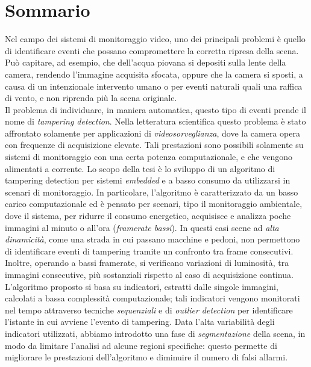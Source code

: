 \newpage
\chapter*{Sommario}


Nel campo dei sistemi di monitoraggio video, uno dei principali problemi \`e quello di identificare eventi che possano compromettere la corretta ripresa della scena.
Pu\`o capitare, ad esempio, che dell'acqua piovana si depositi sulla lente della camera, rendendo l'immagine acquisita sfocata, oppure che la camera si sposti, a causa di un intenzionale intervento umano o per eventi naturali quali una raffica di vento, e non riprenda pi\`u la scena originale.\\

Il problema di individuare, in maniera automatica, questo tipo di eventi prende il nome di \textit{tampering detection}. 
Nella letteratura scientifica questo problema \`e stato affrontato solamente per applicazioni di \textit{videosorveglianza}, dove la camera opera con frequenze di acquisizione elevate. 
Tali prestazioni sono possibili solamente su sistemi di monitoraggio con una certa potenza computazionale, e che vengono alimentati a corrente.
Lo scopo della tesi \`e lo sviluppo di un algoritmo di tampering detection per sistemi \textit{embedded} e a basso consumo da utilizzarsi in scenari di monitoraggio. In particolare, l'algoritmo \`e caratterizzato da un basso carico computazionale ed \`e pensato per scenari, tipo il monitoraggio ambientale, dove il sistema, per ridurre il consumo energetico, acquisisce e analizza poche immagini al minuto o all'ora (\textit{framerate bassi}).
In questi casi scene ad \textit{alta dinamicit\`a}, come una strada in cui passano macchine e pedoni, non permettono di identificare eventi di tampering tramite un confronto tra frame consecutivi. 
Inoltre, operando a bassi framerate, si verificano variazioni di luminosit\`a, tra immagini consecutive, pi\`u sostanziali rispetto al caso di acquisizione continua. \\ 
L'algoritmo proposto si basa su indicatori, estratti dalle singole immagini, calcolati a bassa complessit\`a computazionale; tali indicatori vengono monitorati nel tempo attraverso tecniche \textit{sequenziali} e di \textit{outlier detection} per identificare l'istante in cui avviene l'evento di tampering.
Data l'alta variabilit\`a degli indicatori utilizzati, abbiamo introdotto una fase di \textit{segmentazione} della scena, in modo da limitare l'analisi ad alcune regioni specifiche:
questo permette di migliorare le prestazioni dell'algoritmo e diminuire il numero di falsi allarmi.\\

